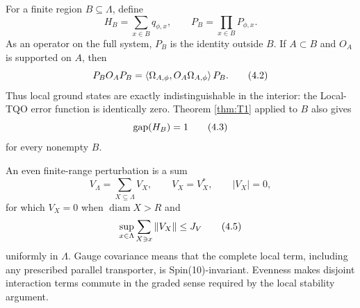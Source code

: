For a finite region $B\subseteq\Lambda$, define
\[
 H_B=\sum_{x\in B}q_{\phi,x},\qquad
 P_B=\prod_{x\in B}P_{\phi,x}.
\tag{4.1}\label{eq:localHB}
\]
As an operator on the full system, $P_B$ is the identity outside
$B$.  If $A\subset B$ and $O_A$ is supported on $A$, then
\[
 P_BO_AP_B
 =\left\langle \Omega_{A,\phi},O_A\Omega_{A,\phi}\right\rangle P_B.
\tag{4.2}\label{eq:exactLTQO}
\]
Thus local ground states are exactly indistinguishable in the
interior: the Local-TQO error function is identically zero.  Theorem
\ref{thm:T1} applied to $B$ also gives
\[
 \operatorname{gap}(H_B)=1
\tag{4.3}\label{eq:localgap}
\]
for every nonempty $B$.

\begin{definition}
\label{def:pert}
An even finite-range perturbation is a sum
\[
 V_\Lambda=\sum_{X\subseteq\Lambda}V_X,\qquad
 V_X=V_X^*,\qquad |V_X|=0,
\tag{4.4}\label{eq:pert}
\]
for which $V_X=0$ when $\operatorname{diam}X>R$ and
\[
 \sup_{x\in\Lambda}\sum_{X\ni x}\left\lVert V_X\right\rVert\leq J_V
\tag{4.5}\label{eq:interactionnorm}
\]
uniformly in $\Lambda$.  Gauge covariance means that the complete
local term, including any prescribed parallel transporter, is
Spin(10)-invariant.  Evenness makes disjoint interaction terms commute
in the graded sense required by the local stability argument.
\end{definition}

